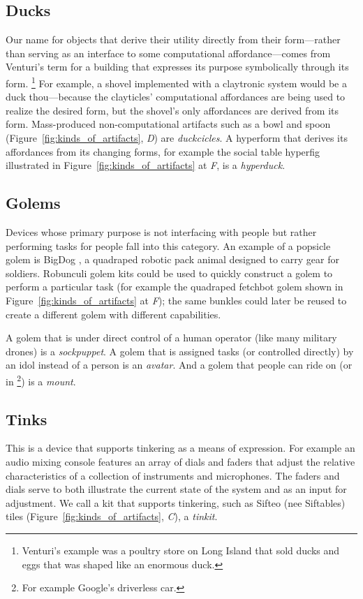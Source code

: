 \subsection{Ducks}
%
Our name for objects that derive their utility directly from their form---rather than serving as an interface to some computational affordance---comes from Venturi's term \citeyearpar{venturi_vegas} for a building that expresses its purpose symbolically through its form.%
\footnote{Venturi's example was a poultry store on Long Island that sold ducks and eggs that was shaped like an enormous duck.}
For example, a shovel implemented with a claytronic system would be a duck thou---because the clayticles' computational affordances are being used to realize the desired form, but the shovel's only affordances are derived from its form. 
Mass-produced non-computational artifacts such as a bowl and spoon (Figure~\ref{fig:kinds_of_artifacts}, \emph{D}) are \emph{duckcicles}. 
A hyperform that derives its affordances from its changing forms, for example the social table hyperfig illustrated in Figure~\ref{fig:kinds_of_artifacts} at \emph{F}, is a \emph{hyperduck}.

\subsection{Golems}
%
Devices whose primary purpose is not interfacing with people but rather performing tasks for people fall into this category. 
An example of a popsicle golem is BigDog \citep{bigdog}, a quadraped robotic pack animal designed to carry gear for soldiers. 
Robunculi golem kits could be used to quickly construct a golem to perform a particular task (for example the quadraped fetchbot golem shown in Figure~\ref{fig:kinds_of_artifacts} at \emph{F}); the same bunkles could later be reused to create a different golem with different capabilities. 

A golem that is under direct control of a human operator (like many military drones) is a \emph{sockpuppet}. A golem that is assigned tasks (or controlled directly) by an idol instead of a person is an \emph{avatar}. And a golem that people can ride on (or in%
\footnote{For example Google's driverless car.})
is a \emph{mount}.

\subsection{Tinks}
%
This is a device that supports tinkering as a means of expression. For example an audio mixing console features an array of dials and faders that adjust the relative characteristics of a collection of instruments and microphones. 
The faders and dials serve to both illustrate the current state of the system and as an input for adjustment. 
We call a kit that supports tinkering, such as Sifteo (nee Siftables) tiles \citep{siftables} (Figure~\ref{fig:kinds_of_artifacts}, \emph{C}), a \emph{tinkit}. 

